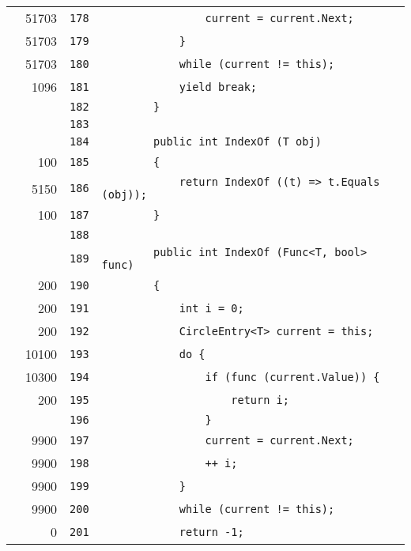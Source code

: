 \documentclass[a4paper,10pt]{article}
\begin{document}
\begin{longtable}[l]{lrrl}
\cellcolor{green} & 51703 & \verb~178~ & \verb~                current = current.Next;~\\
\cellcolor{green} & 51703 & \verb~179~ & \verb~            }~\\
\cellcolor{green} & 51703 & \verb~180~ & \verb~            while (current != this);~\\
\cellcolor{green} & 1096 & \verb~181~ & \verb~            yield break;~\\
\cellcolor{gray} &  & \verb~182~ & \verb~        }~\\
\cellcolor{gray} &  & \verb~183~ & \verb~~\\
\cellcolor{gray} &  & \verb~184~ & \verb~        public int IndexOf (T obj)~\\
\cellcolor{green} & 100 & \verb~185~ & \verb~        {~\\
\cellcolor{green} & 5150 & \verb~186~ & \verb~            return IndexOf ((t) => t.Equals (obj));~\\
\cellcolor{green} & 100 & \verb~187~ & \verb~        }~\\
\cellcolor{gray} &  & \verb~188~ & \verb~~\\
\cellcolor{gray} &  & \verb~189~ & \verb~        public int IndexOf (Func<T, bool> func)~\\
\cellcolor{green} & 200 & \verb~190~ & \verb~        {~\\
\cellcolor{green} & 200 & \verb~191~ & \verb~            int i = 0;~\\
\cellcolor{green} & 200 & \verb~192~ & \verb~            CircleEntry<T> current = this;~\\
\cellcolor{green} & 10100 & \verb~193~ & \verb~            do {~\\
\cellcolor{green} & 10300 & \verb~194~ & \verb~                if (func (current.Value)) {~\\
\cellcolor{green} & 200 & \verb~195~ & \verb~                    return i;~\\
\cellcolor{gray} &  & \verb~196~ & \verb~                }~\\
\cellcolor{green} & 9900 & \verb~197~ & \verb~                current = current.Next;~\\
\cellcolor{green} & 9900 & \verb~198~ & \verb~                ++ i;~\\
\cellcolor{green} & 9900 & \verb~199~ & \verb~            }~\\
\cellcolor{green} & 9900 & \verb~200~ & \verb~            while (current != this);~\\
\cellcolor{red} & 0 & \verb~201~ & \verb~            return -1;~\\

\end{longtable}
\end{document}
